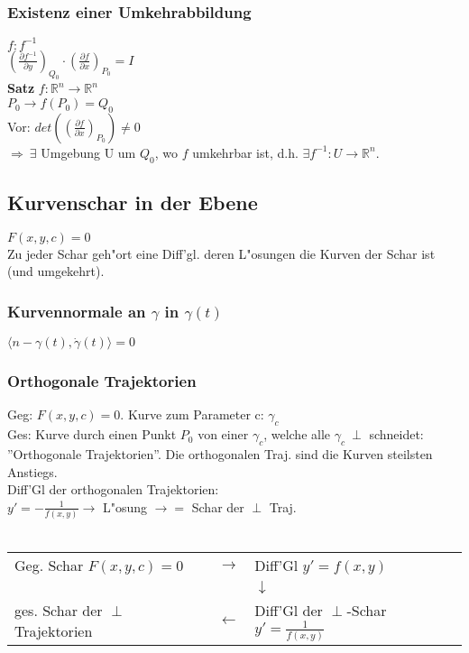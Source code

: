 \documentclass[10pt, a4paper, twocolumn]{scrartcl}
\begin{document}
\subsubsection{Existenz einer Umkehrabbildung}

$f:f^{-1}$\\
$(\frac{\partial f^{-1}}{\partial y})_{Q_0}\cdotp(\frac{\partial f}{\partial x})_{P_0}=I$\\

\textbf{Satz} $f:\mathbb{R}^n\rightarrow\mathbb{R}^n$\\
$P_0\rightarrow f(P_0)=Q_0$\\
Vor: $det((\frac{\partial f}{\partial x})_{P_0})\neq 0$\\
$\Rightarrow\:\exists$ Umgebung U um $Q_0$, wo $f$ umkehrbar ist, d.h. $\exists f^{-1}:U\rightarrow\mathbb{R}^n$.


\subsection{Kurvenschar in der Ebene}
$F(x,y,c)=0$\\
Zu jeder Schar geh"ort eine Diff'gl. deren L"osungen die Kurven der Schar ist (und umgekehrt).

\subsubsection{Kurvennormale an $\gamma$ in  $\gamma(t)$}

$\langle n- \gamma(t),\dot{\gamma}(t)\rangle=0$

\subsubsection{Orthogonale Trajektorien}

Geg: $F(x,y,c)=0$. Kurve zum Parameter c: $\gamma_c$\\
Ges: Kurve durch einen Punkt $P_0$ von einer $\gamma_c$, welche alle $\gamma_c\:\perp$ schneidet: ''Orthogonale Trajektorien''. Die orthogonalen Traj. sind die Kurven steilsten Anstiegs.\\

Diff'Gl der orthogonalen Trajektorien:\\
$y'=-\frac{1}{f(x,y)}\rightarrow$ L"osung $\rightarrow=$ Schar der $\perp$ Traj.\\\\

\begin{tabular}{p{3cm}cp{3cm}}
 Geg. Schar $F(x,y,c)=0$ &	$\rightarrow$ &		Diff'Gl $y'=f(x,y)$\\
 &				&			$\downarrow$\\
 ges. Schar der $\perp$ Trajektorien & $\leftarrow$ &	Diff'Gl der $\perp$-Schar $y'=\frac{1}{f(x,y)}$
\end{tabular}
\end{document}
